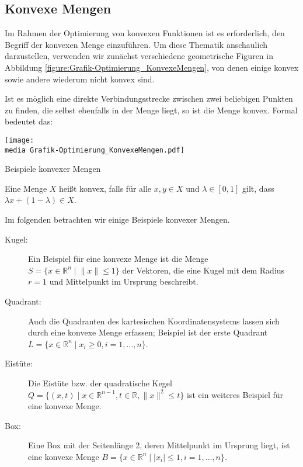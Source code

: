 \subsection{Konvexe Mengen}
Im Rahmen der Optimierung von konvexen Funktionen ist es erforderlich, den Begriff der konvexen Menge einzuführen. Um diese Thematik anschaulich darzustellen, verwenden wir zunächst verschiedene geometrische Figuren in Abbildung \ref{figure:Grafik-Optimierung_KonvexeMengen}, von denen einige konvex sowie andere wiederum nicht konvex sind.

Ist es möglich eine direkte Verbindungsstrecke zwischen zwei beliebigen Punkten zu finden, die selbst ebenfalls in der Menge liegt, so ist die Menge konvex. Formal bedeutet das:

\begin{dsafigure}
\begin{center}
\texttt{[image: \\media Grafik-Optimierung\_KonvexeMengen.pdf]}
\label{figure:Grafik-Optimierung_KonvexeMengen}
\caption{Beispiele konvexer Mengen}
\end{center}
\end{dsafigure}

\begin{Def}
Eine Menge $X$ heißt konvex, falls für alle $x, y \in X$ und $\lambda \in [0,1]$ gilt, dass $\lambda x + (1 - \lambda) \in X$.
\end{Def}

Im folgenden betrachten wir einige Beispiele konvexer Mengen.
\begin{description}
\item[Kugel:]
Ein Beispiel für eine konvexe Menge ist die Menge $S = \{x \in \mathbb{R}^{n} \mid \lVert x \rVert \le 1\}$ der Vektoren, die eine Kugel mit dem Radius $r = 1$ und Mittelpunkt im Ursprung beschreibt.
\item[Quadrant:] Auch die Quadranten des kartesischen Koordinatensystems lassen sich durch eine konvexe Menge erfassen; Beispiel ist der erste Quadrant $L = \{ x \in \mathbb{R}^{n} \mid x_i \ge 0, i=1,\dots,n\}$.
\item[Eistüte:] Die Eistüte bzw. der quadratische Kegel $Q = \{(x, t) \mid x\in \mathbb{R}^{n-1}, t\in \mathbb{R}, \lVert x\rVert ^{2} \le t\}$ ist ein weiteres Beispiel für eine konvexe Menge.
\item[Box:] Eine Box mit der Seitenlänge 2, deren Mittelpunkt im Ursprung liegt, ist eine konvexe Menge $B = \{x \in \mathbb{R}^{n} \mid |x_{i}| \le 1, i = 1, \dots, n\}$.
\end{description}

